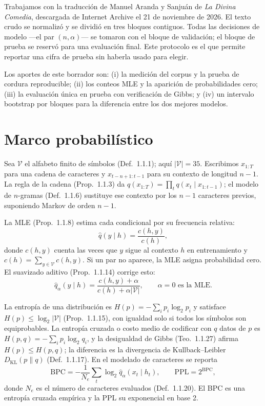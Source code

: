 \documentclass[11pt,letterpaper]{article}
\begin{document}
Trabajamos con la traducción de Manuel Aranda y Sanjuán de \emph{La Divina
Comedia}, descargada de Internet Archive el 21 de noviembre de 2026. El texto
crudo se normalizó y se dividió en tres bloques contiguos. Todas las decisiones
de modelo ---el par $(n,\alpha)$--- se tomaron con el bloque de validación; el
bloque de prueba se reservó para una evaluación final. Este protocolo es el
que permite reportar una cifra de prueba sin haberla usado para elegir.

Los aportes de este borrador son: (i) la medición del corpus y la prueba de
cordura reproducible; (ii) los conteos MLE y la aparición de probabilidades
cero; (iii) la evaluación única en prueba con verificación de Gibbs; y (iv) un
intervalo bootstrap por bloques para la diferencia entre los dos mejores
modelos.

\section{Marco probabilístico}

Sea $\mathcal{V}$ el alfabeto finito de símbolos (Def.\ 1.1.1); aquí
$\vert\mathcal{V}\vert=35$. Escribimos $x_{1:T}$ para una cadena de caracteres
y $x_{t-n+1:t-1}$ para su contexto de longitud $n-1$. La regla de la cadena
(Prop.\ 1.1.3) da $q(x_{1:T})=\prod_t q(x_t\mid x_{1:t-1})$; el modelo de
$n$-gramas (Def.\ 1.1.6) sustituye ese contexto por los $n-1$ caracteres
previos, suponiendo Markov de orden $n-1$.

La MLE (Prop.\ 1.1.8) estima cada condicional por su frecuencia relativa:
\begin{equation}
  \hat q(y\mid h)=\frac{c(h,y)}{c(h)} ,
\end{equation}
donde $c(h,y)$ cuenta las veces que $y$ sigue al contexto $h$ en entrenamiento
y $c(h)=\sum_{y\in\mathcal{V}}c(h,y)$. Si un par no aparece, la MLE asigna
probabilidad cero. El suavizado aditivo (Prop.\ 1.1.14) corrige esto:
\begin{equation}
  \hat q_\alpha(y\mid h)=\frac{c(h,y)+\alpha}{c(h)+\alpha\vert\mathcal{V}\vert},
  \qquad \alpha=0 \text{ es la MLE}. \tag{2}
\end{equation}

La entropía de una distribución es $H(p)=-\sum_i p_i\log_2 p_i$ y satisface
$H(p)\le\log_2\vert\mathcal{V}\vert$ (Prop.\ 1.1.15), con igualdad solo si
todos los símbolos son equiprobables. La entropía cruzada o costo medio de
codificar con $q$ datos de $p$ es $H(p,q)=-\sum_i p_i\log_2 q_i$, y la
desigualdad de Gibbs (Teo.\ 1.1.27) afirma $H(p)\le H(p,q)$; la diferencia es
la divergencia de Kullback--Leibler $D_{\mathrm{KL}}(p\|q)$ (Def.\ 1.1.17).
En el modelado de caracteres se reporta
\begin{equation}
  \mathrm{BPC}=-\frac{1}{N_e}\sum_t\log_2\hat q_\alpha(x_t\mid h_t),
  \qquad \mathrm{PPL}=2^{\mathrm{BPC}}, \tag{3}
\end{equation}
donde $N_e$ es el número de caracteres evaluados (Def.\ 1.1.20). El BPC es una
entropía cruzada empírica y la PPL su exponencial en base 2.
\end{document}
